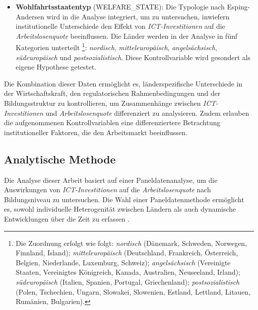 \begin{itemize}
    \item \textbf{Wohlfahrtsstaatentyp} (WELFARE\_STATE): Die Typologie nach Esping-Andersen 
    \parencite{espingandersen1990thethree} wird in die Analyse integriert, um zu untersuchen, 
    inwiefern institutionelle Unterschiede den Effekt von \textit{\ac{ICT}-Investitionen} auf 
    die \textit{Arbeitslosenquote} beeinflussen. Die Länder werden in der Analyse in fünf 
    Kategorien unterteilt
    \footnote{
        Die Zuordnung erfolgt wie folgt: 
        \textit{nordisch} (Dänemark, Schweden, Norwegen, Finnland, Island); 
        \textit{mitteleuropäisch} (Deutschland, Frankreich, Österreich, Belgien, Niederlande, 
        Luxemburg, Schweiz); 
        \textit{angelsächsisch} 
        (Vereinigte Staaten, Vereinigtes Königreich, Kanada, Australien, Neuseeland, Irland); 
        \textit{südeuropäisch} (Italien, Spanien, Portugal, Griechenland); 
        \textit{postsozialistisch} (Polen, Tschechien, Ungarn, Slowakei, Slowenien, Estland, 
        Lettland, Litauen, Rumänien, Bulgarien).
    }: \textit{nordisch}, \textit{mitteleuropäisch}, \textit{angelsächsisch}, 
    \textit{südeuropäisch} und \textit{postsozialistisch}. Diese Kontrollvariable wird 
    gesondert als eigene Hypothese getestet.

\end{itemize}

Die Kombination dieser Daten ermöglicht es, länderspezifische Unterschiede in der 
Wirtschaftskraft, den regulatorischen Rahmenbedingungen und der Bildungsstruktur zu 
kontrollieren, um Zusammenhänge zwischen \textit{\ac{ICT}-Investitionen} und 
\textit{Arbeitslosenquote} differenziert zu analysieren. Zudem erlauben die aufgenommenen 
Kontrollvariablen eine differenziertere Betrachtung institutioneller Faktoren, die den 
Arbeitsmarkt beeinflussen. 


\subsection{Analytische Methode}

Die Analyse dieser Arbeit basiert auf einer Paneldatenanalyse, um die Auswirkungen von 
\textit{\ac{ICT}-Investitionen} auf die \textit{Arbeitslosenquote} nach Bildungsniveau zu 
untersuchen. Die Wahl einer Paneldatenmethode ermöglicht es, sowohl individuelle Heterogenität 
zwischen Ländern als auch dynamische Entwicklungen über die Zeit zu erfassen 
\parencite{wooldridge2010econometric}. 

